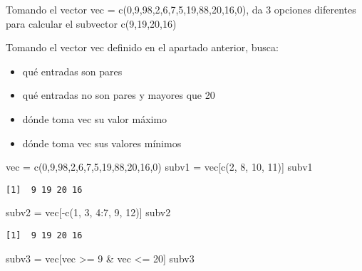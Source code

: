 \documentclass[
]{article}
\newenvironment{Shaded}{\begin{snugshade}}{\end{snugshade}}
\newcommand{\DecValTok}[1]{\textcolor[rgb]{0.00,0.00,0.81}{#1}}
\newcommand{\FunctionTok}[1]{\textcolor[rgb]{0.00,0.00,0.00}{#1}}
\newcommand{\NormalTok}[1]{#1}
\newcommand{\OtherTok}[1]{\textcolor[rgb]{0.56,0.35,0.01}{#1}}
\newcommand{\SpecialCharTok}[1]{\textcolor[rgb]{0.00,0.00,0.00}{#1}}
\providecommand{\tightlist}{%
  \setlength{\itemsep}{0pt}\setlength{\parskip}{0pt}}
\begin{document}
Tomando el vector vec = c(0,9,98,2,6,7,5,19,88,20,16,0), da 3 opciones
diferentes para calcular el subvector c(9,19,20,16)

Tomando el vector vec definido en el apartado anterior, busca:

\begin{itemize}
\tightlist
\item
  qué entradas son pares
\item
  qué entradas no son pares y mayores que 20
\item
  dónde toma vec su valor máximo
\item
  dónde toma vec sus valores mínimos
\end{itemize}

\begin{Shaded}
\begin{Highlighting}[]
\NormalTok{vec }\OtherTok{=} \FunctionTok{c}\NormalTok{(}\DecValTok{0}\NormalTok{,}\DecValTok{9}\NormalTok{,}\DecValTok{98}\NormalTok{,}\DecValTok{2}\NormalTok{,}\DecValTok{6}\NormalTok{,}\DecValTok{7}\NormalTok{,}\DecValTok{5}\NormalTok{,}\DecValTok{19}\NormalTok{,}\DecValTok{88}\NormalTok{,}\DecValTok{20}\NormalTok{,}\DecValTok{16}\NormalTok{,}\DecValTok{0}\NormalTok{)}
\NormalTok{subv1 }\OtherTok{=}\NormalTok{ vec[}\FunctionTok{c}\NormalTok{(}\DecValTok{2}\NormalTok{, }\DecValTok{8}\NormalTok{, }\DecValTok{10}\NormalTok{, }\DecValTok{11}\NormalTok{)]}
\NormalTok{subv1}
\end{Highlighting}
\end{Shaded}

\begin{verbatim}
[1]  9 19 20 16
\end{verbatim}

\begin{Shaded}
\begin{Highlighting}[]
\NormalTok{subv2 }\OtherTok{=}\NormalTok{ vec[}\SpecialCharTok{{-}}\FunctionTok{c}\NormalTok{(}\DecValTok{1}\NormalTok{, }\DecValTok{3}\NormalTok{, }\DecValTok{4}\SpecialCharTok{:}\DecValTok{7}\NormalTok{, }\DecValTok{9}\NormalTok{, }\DecValTok{12}\NormalTok{)]}
\NormalTok{subv2}
\end{Highlighting}
\end{Shaded}

\begin{verbatim}
[1]  9 19 20 16
\end{verbatim}

\begin{Shaded}
\begin{Highlighting}[]
\NormalTok{subv3 }\OtherTok{=}\NormalTok{ vec[vec }\SpecialCharTok{\textgreater{}=} \DecValTok{9} \SpecialCharTok{\&}\NormalTok{ vec }\SpecialCharTok{\textless{}=} \DecValTok{20}\NormalTok{]}
\NormalTok{subv3}
\end{Highlighting}
\end{Shaded}
\end{document}
